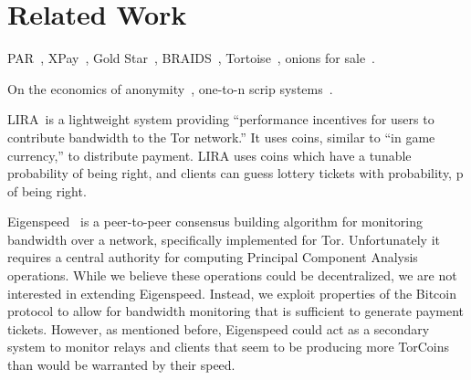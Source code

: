 \section{Related Work} \label{rel}

PAR~\cite{raykova-pet2008}, XPay~\cite{wpes09-xpay}, Gold Star~, BRAIDS~\cite{ccs10-braids}, Tortoise~, onions for sale~\cite{johnson2013onions}.

On the economics of anonymity~\cite{Acquisti03onthe}, one-to-n scrip systems~\cite{humbert2011-scrip}.

LIRA~\cite{jansen2013lira}is a lightweight system providing “performance incentives for users to contribute bandwidth to the Tor network.” It uses coins, similar to “in game currency,” to distribute payment. LIRA uses coins which have a tunable probability of being right, and clients can guess lottery tickets with probability, p of being right. 

Eigenspeed~\cite{snader2009eigenspeed} is a peer-to-peer consensus building algorithm for monitoring bandwidth over a network, specifically implemented for Tor. Unfortunately it requires a central authority for computing Principal Component Analysis operations. While we believe these operations could be decentralized, we are not interested in extending Eigenspeed. Instead, we exploit properties of the Bitcoin protocol to allow for bandwidth monitoring that is sufficient to generate payment tickets. However, as mentioned before, Eigenspeed could act as a secondary system to monitor relays and clients that seem to be producing more TorCoins than would be warranted by their speed.  